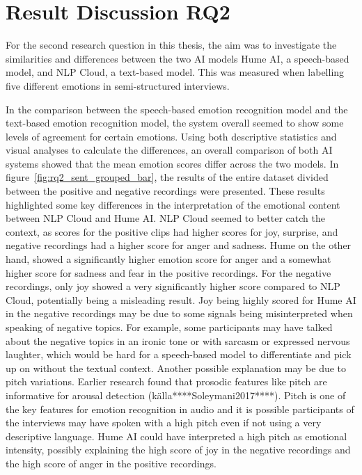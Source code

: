 
\section{Result Discussion RQ2}
For the second research question in this thesis, the aim was to investigate the similarities and differences between the two AI models Hume AI, a speech-based model, and NLP Cloud, a text-based model. This was measured when labelling five different emotions in semi-structured interviews.

\label{subsec:RQ2interpretation}
In the comparison between the speech-based emotion recognition model and the text-based emotion recognition model, the system overall seemed to show some levels of agreement for certain emotions. Using both descriptive statistics and visual analyses to calculate the differences, an overall comparison of both AI systems showed that the mean emotion scores differ across the two models.
In figure~\ref{fig:rq2_sent_grouped_bar}, the results of the entire dataset divided between the positive and negative recordings were presented. These results highlighted some key differences in the interpretation of the emotional content between NLP Cloud and Hume AI. NLP Cloud seemed to better catch the context, as scores for the positive clips had higher scores for joy, surprise, and negative recordings had a higher score for anger and sadness. 
Hume on the other hand, showed a significantly higher emotion score for anger and a somewhat higher score for sadness and fear in the positive recordings. For the negative recordings, only joy showed a very significantly higher score compared to NLP Cloud, potentially being a misleading result. Joy being highly scored for Hume AI in the negative recordings may be due to some signals being misinterpreted when speaking of negative topics. For example, some participants may have talked about the negative topics in an ironic tone or with sarcasm or expressed nervous laughter, which would be hard for a speech-based model to differentiate and pick up on without the textual context.
Another possible explanation may be due to pitch variations. Earlier research found that prosodic features like pitch are informative for arousal detection (källa****Soleymani2017****). Pitch is one of the key features for emotion recognition in audio and it is possible participants of the interviews may have spoken with a high pitch even if not using a very descriptive language. Hume AI could have interpreted a high pitch as emotional intensity, possibly explaining the high score of joy in the negative recordings and the high score of anger in the positive recordings.

